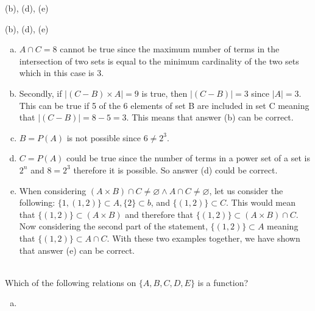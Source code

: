 \begin{solution}
(b), (d), (e)

\begin{enumerate}[(a)]
\end{enumerate}
\begin{solution}

(b), (d), (e)

\begin{enumerate}[(a)]
    \item $A \cap C = 8$ cannot be true since the maximum number of terms in the intersection of two sets is equal to the minimum cardinality of the two sets which in this case is 3.
    \item
    Secondly, if $|(C - B) \times A| = 9$ is true, then $|(C - B)| = 3$ since $|A| = 3$. This can be true if 5 of the 6 elements of set B are included in set C meaning that $|(C - B)| = 8 - 5 = 3$. This means that answer (b) can be correct.
    \item
    $B = P(A)$ is not possible since $6 \neq 2^3$.
    \item
    $C = P(A)$ could be true since the number of terms in a power set of a set is $2^n$ and $8 = 2^3$ therefore it is possible. So answer (d) could be correct.
    \item
    When considering $(A \times B)  \cap C  \neq \varnothing \wedge A \cap C \neq \varnothing$, let us consider the following: $\{1, (1,2)\} \subset A, \{2\} \subset b$, and $\{(1,2)\} \subset C$. This would mean that $\{(1,2)\} \subset (A \times B)$ and therefore that $\{(1,2)\} \subset (A \times B) \cap C$. Now considering the second part of the statement, $\{(1,2)\} \subset A$ meaning that $\{(1,2)\} \subset A \cap C$. With these two examples together, we have shown that answer (e) can be correct.
\end{enumerate}
    


\end{solution}
\\
    Which of the following relations on $\{A, B, C, D, E\}$ is a function?
    
    \begin{enumerate} [a)]
        \item 
\end{enumerate}
\end{solution}
